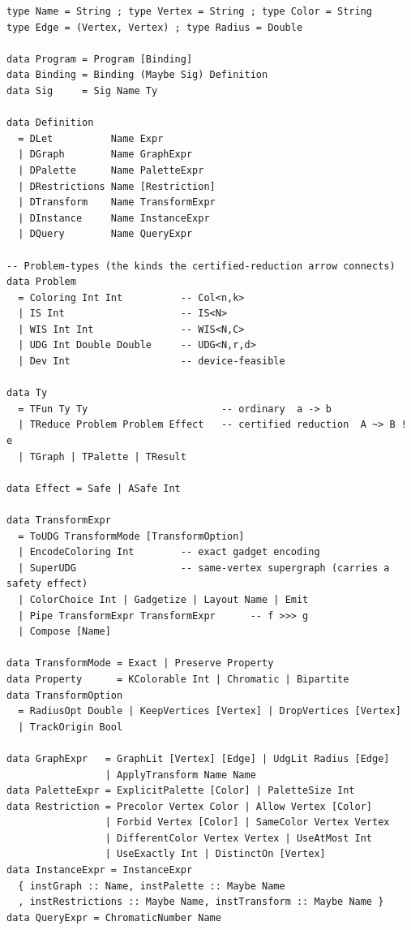\documentclass[11pt]{article}
\theoremstyle{definition}
\theoremstyle{remark}
\begin{document}
\begin{lstlisting}[style=plain]
type Name = String ; type Vertex = String ; type Color = String
type Edge = (Vertex, Vertex) ; type Radius = Double

data Program = Program [Binding]
data Binding = Binding (Maybe Sig) Definition
data Sig     = Sig Name Ty

data Definition
  = DLet          Name Expr
  | DGraph        Name GraphExpr
  | DPalette      Name PaletteExpr
  | DRestrictions Name [Restriction]
  | DTransform    Name TransformExpr
  | DInstance     Name InstanceExpr
  | DQuery        Name QueryExpr

-- Problem-types (the kinds the certified-reduction arrow connects)
data Problem
  = Coloring Int Int          -- Col<n,k>
  | IS Int                    -- IS<N>
  | WIS Int Int               -- WIS<N,C>
  | UDG Int Double Double     -- UDG<N,r,d>
  | Dev Int                   -- device-feasible

data Ty
  = TFun Ty Ty                       -- ordinary  a -> b
  | TReduce Problem Problem Effect   -- certified reduction  A ~> B ! e
  | TGraph | TPalette | TResult

data Effect = Safe | ASafe Int

data TransformExpr
  = ToUDG TransformMode [TransformOption]
  | EncodeColoring Int        -- exact gadget encoding
  | SuperUDG                  -- same-vertex supergraph (carries a safety effect)
  | ColorChoice Int | Gadgetize | Layout Name | Emit
  | Pipe TransformExpr TransformExpr      -- f >>> g
  | Compose [Name]

data TransformMode = Exact | Preserve Property
data Property      = KColorable Int | Chromatic | Bipartite
data TransformOption
  = RadiusOpt Double | KeepVertices [Vertex] | DropVertices [Vertex]
  | TrackOrigin Bool

data GraphExpr   = GraphLit [Vertex] [Edge] | UdgLit Radius [Edge]
                 | ApplyTransform Name Name
data PaletteExpr = ExplicitPalette [Color] | PaletteSize Int
data Restriction = Precolor Vertex Color | Allow Vertex [Color]
                 | Forbid Vertex [Color] | SameColor Vertex Vertex
                 | DifferentColor Vertex Vertex | UseAtMost Int
                 | UseExactly Int | DistinctOn [Vertex]
data InstanceExpr = InstanceExpr
  { instGraph :: Name, instPalette :: Maybe Name
  , instRestrictions :: Maybe Name, instTransform :: Maybe Name }
data QueryExpr = ChromaticNumber Name
\end{lstlisting}
\end{document}
